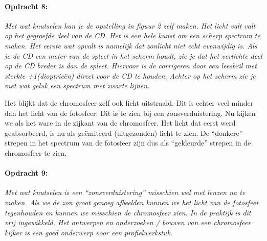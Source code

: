 \paragraph*{Opdracht 8:}

\emph{Met wat knutselen kun je de opstelling in figuur 2 zelf maken.
Het licht valt valt op het gegroefde deel van de CD. Het is een hele
kunst om een scherp spectrum te maken. Het eerste wat opvalt is namelijk
dat zonlicht niet echt evenwijdig is. Als je de CD een meter van de
spleet in het scherm houdt, zie je dat het verlichte deel op de CD
breder is dan de spleet. Hiervoor is de corrigeren door een leesbril
met sterkte +1(dioptrieën) direct voor de CD te houden. Achter op
het scherm zie je met wat geluk een spectrum met zwarte lijnen.}

Het blijkt dat de chromosfeer zelf ook licht uitstraald. Dit is echter
veel minder dan het licht van de fotosfeer. Dit is te zien bij een
zonsverduistering. Nu kijken we als het ware in de zijkant van de
chromosfeer. Het licht dat eerst werd geabsorbeerd, is nu als geëmiteerd
(uitgezonden) licht te zien. De ``donkere'' strepen in het spectrum
van de fotosfeer zijn dus als ``gekleurde'' strepen in de chromosfeer
te zien.


\paragraph*{Opdracht 9:}

\emph{Met wat knutselen is een ``zonsverduistering'' misschien wel
met lenzen na te maken. Als we de zon groot genoeg afbeelden kunnen
we het licht van de fotosfeer tegenhouden en kunnen we misschien de
chromosfeer zien. In de praktijk is dit vrij ingewikkeld. Het ontwerpen
en onderzoeken / bouwen van een chromosfeer kijker is een goed onderwerp
voor een profielwerkstuk.}


